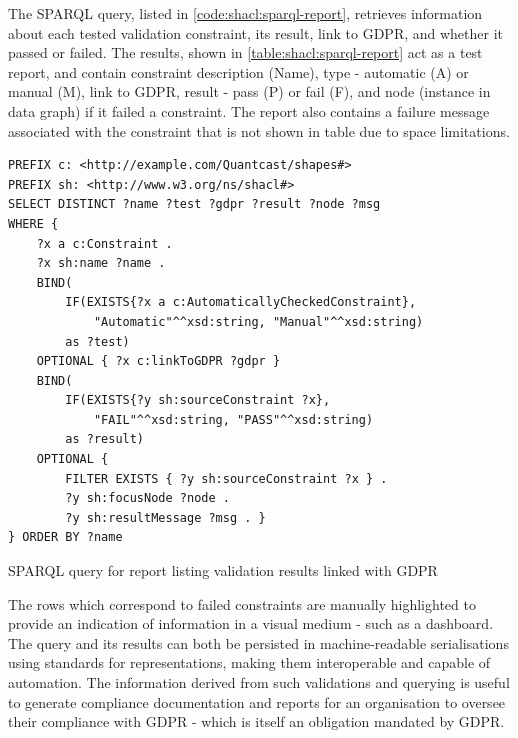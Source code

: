 The SPARQL query, listed in \autoref{code:shacl:sparql-report}, retrieves information about each tested validation constraint, its result, link to GDPR, and whether it passed or failed.
The results, shown in \autoref{table:shacl:sparql-report} act as a test report, and contain constraint description (Name), type - automatic (A) or manual (M), link to GDPR, result - pass (P) or fail (F), and node (instance in data graph) if it failed a constraint.
The report also contains a failure message associated with the constraint that is not shown in table due to space limitations.
\begin{listing}[htbp]
\begin{verbatim}
PREFIX c: <http://example.com/Quantcast/shapes#>
PREFIX sh: <http://www.w3.org/ns/shacl#>
SELECT DISTINCT ?name ?test ?gdpr ?result ?node ?msg
WHERE {
    ?x a c:Constraint .
    ?x sh:name ?name .
    BIND(
        IF(EXISTS{?x a c:AutomaticallyCheckedConstraint},
            "Automatic"^^xsd:string, "Manual"^^xsd:string)
        as ?test)
    OPTIONAL { ?x c:linkToGDPR ?gdpr }
    BIND(
        IF(EXISTS{?y sh:sourceConstraint ?x},
            "FAIL"^^xsd:string, "PASS"^^xsd:string)
        as ?result)
    OPTIONAL {
        FILTER EXISTS { ?y sh:sourceConstraint ?x } .
        ?y sh:focusNode ?node .
    	?y sh:resultMessage ?msg . }
} ORDER BY ?name
\end{verbatim}
\caption{SPARQL query for report listing validation results linked with GDPR}
\label{code:shacl:sparql-report}
\end{listing}


The rows which correspond to failed constraints are manually highlighted to provide an indication of information in a visual medium - such as a dashboard.
The query and its results can both be persisted in machine-readable serialisations using standards for representations, making them interoperable and capable of automation.
The information derived from such validations and querying is useful to generate compliance documentation and reports for an organisation to oversee their compliance with GDPR - which is itself an obligation mandated by GDPR.

